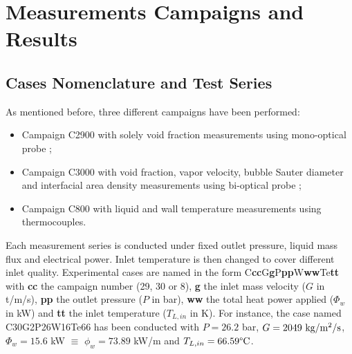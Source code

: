 \section{Measurements Campaigns and Results}
\label{sec:deb_exp_campaign}


\subsection{Cases Nomenclature and Test Series}

As mentioned before, three different campaigns have been performed:

\begin{itemize}
\item Campaign C2900 with solely void fraction measurements using mono-optical probe ;

\item Campaign C3000 with void fraction, vapor velocity, bubble Sauter diameter and interfacial area density measurements using bi-optical probe ;

\item Campaign C800 with liquid and wall temperature measurements using thermocouples.
\end{itemize}


Each measurement series is conducted under fixed outlet pressure, liquid mass flux and electrical power. Inlet temperature is then changed to cover different inlet quality. Experimental cases are named in the form C\textbf{cc}G\textbf{g}P\textbf{pp}W\textbf{ww}Te\textbf{tt} with \textbf{cc} the campaign number (29, 30 or 8), \textbf{g} the inlet mass velocity ($G$ in t/m/s), \textbf{pp} the outlet pressure ($P$ in bar), \textbf{ww} the total heat power applied ($\Phi_{w}$ in kW) and \textbf{tt} the inlet temperature ($T_{L,in}$ in K). For instance, the case named C30G2P26W16Te66 has been conducted with $P=26.2$ bar, $G=2049\ \text{kg/m$^{2}$/s}$, $\Phi_{w}=15.6$ kW $\equiv$ $\phi_{w} =73.89$ kW/m and $T_{L,in} = 66.59 \degree\mathrm{C}$.


